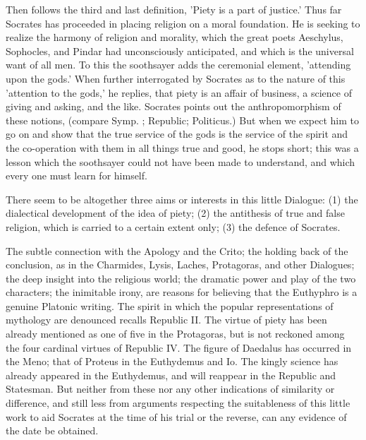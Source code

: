 \documentclass[11pt,letter]{article}
\begin{document}
\par  Then follows the third and last definition, 'Piety is a part of justice.' Thus far Socrates has proceeded in placing religion on a moral foundation. He is seeking to realize the harmony of religion and morality, which the great poets Aeschylus, Sophocles, and Pindar had unconsciously anticipated, and which is the universal want of all men. To this the soothsayer adds the ceremonial element, 'attending upon the gods.' When further interrogated by Socrates as to the nature of this 'attention to the gods,' he replies, that piety is an affair of business, a science of giving and asking, and the like. Socrates points out the anthropomorphism of these notions, (compare Symp. ; Republic; Politicus.) But when we expect him to go on and show that the true service of the gods is the service of the spirit and the co-operation with them in all things true and good, he stops short; this was a lesson which the soothsayer could not have been made to understand, and which every one must learn for himself.

\par  There seem to be altogether three aims or interests in this little Dialogue: (1) the dialectical development of the idea of piety; (2) the antithesis of true and false religion, which is carried to a certain extent only; (3) the defence of Socrates.

\par  The subtle connection with the Apology and the Crito; the holding back of the conclusion, as in the Charmides, Lysis, Laches, Protagoras, and other Dialogues; the deep insight into the religious world; the dramatic power and play of the two characters; the inimitable irony, are reasons for believing that the Euthyphro is a genuine Platonic writing. The spirit in which the popular representations of mythology are denounced recalls Republic II. The virtue of piety has been already mentioned as one of five in the Protagoras, but is not reckoned among the four cardinal virtues of Republic IV. The figure of Daedalus has occurred in the Meno; that of Proteus in the Euthydemus and Io. The kingly science has already appeared in the Euthydemus, and will reappear in the Republic and Statesman. But neither from these nor any other indications of similarity or difference, and still less from arguments respecting the suitableness of this little work to aid Socrates at the time of his trial or the reverse, can any evidence of the date be obtained.

\par 
\end{document}
